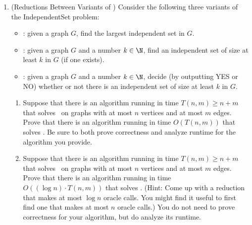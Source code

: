 \documentclass[11pt]{article}
\begin{document}
\begin{enumerate}
\begin{enumerate}
\begin{figure} [H]
    \end{figure}
    \end{enumerate}


  \item (Reductions Between Variants of \IndependentSet)
 Consider the following three variants of the IndependentSet problem:
 \begin{itemize}
     \item \IndependentSetOptimizationSearch: given a graph $G$, find the largest independent set in $G$.
     \item \IndependentSetThresholdSearch: given a graph $G$ and a number $k\in \N$, find an independent set of size at least $k$ in $G$ (if one exists).
     \item \IndependentSetThresholdDecision: given a graph $G$ and a number $k\in \N$, decide (by outputting YES or NO) whether or not there is an independent set of size at least $k$ in $G$.
 \end{itemize}

 \begin{enumerate}
 \item Suppose that there is an algorithm running in time $T(n,m)\geq n+m$ that solves \IndependentSetOptimizationSearch\ on graphs with at most $n$ vertices and at most $m$ edges.  Prove that there is an algorithm running in time $O(T(n,m))$ that solves \IndependentSetThresholdDecision. Be sure to both prove correctness and analyze runtime for the algorithm you provide.

 \item Suppose that there is an algorithm running in time $T(n,m)\geq n+m$ that solves \IndependentSetThresholdSearch\ on graphs with at most $n$ vertices and at most $m$ edges.  Prove that there is an algorithm running in time $O((\log n)\cdot T(n,m))$ that solves \IndependentSetOptimizationSearch.  (Hint: Come up with a reduction that makes at most $\log n$ oracle calls.  You might find it useful to first find one that makes at most $n$ oracle calls.) You do not need to prove correctness for your algorithm, but do analyze its runtime.


\end{enumerate}
\end{enumerate}
\end{document}
